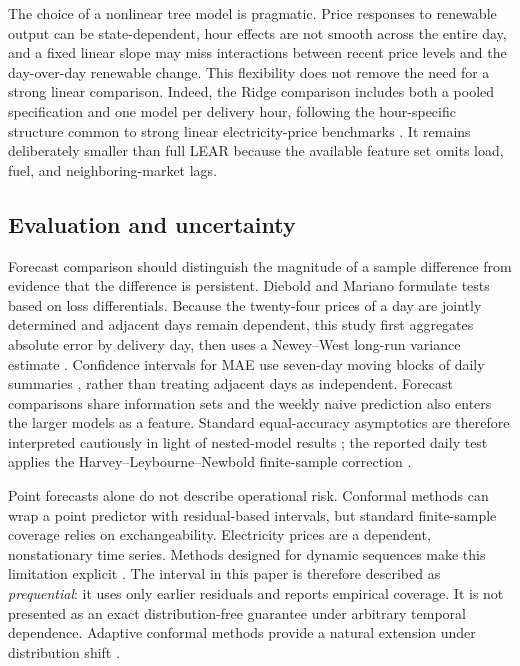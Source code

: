 \documentclass[11pt]{article}
\begin{document}
The choice of a nonlinear tree model is pragmatic.  Price responses to
renewable output can be state-dependent, hour effects are not smooth across
the entire day, and a fixed linear slope may miss interactions between recent
price levels and the day-over-day renewable change.  This flexibility does
not remove the need for a strong linear comparison.  Indeed, the Ridge
comparison includes both a pooled specification and one model per delivery
hour, following the hour-specific structure common to strong linear
electricity-price benchmarks \cite{lago2021}. It remains deliberately smaller
than full LEAR because the available feature set omits load, fuel, and
neighboring-market lags.

\subsection{Evaluation and uncertainty}

Forecast comparison should distinguish the magnitude of a sample difference
from evidence that the difference is persistent.  Diebold and Mariano
\cite{diebold1995} formulate tests based on loss differentials.  Because the
twenty-four prices of a day are jointly determined and adjacent days remain
dependent, this study first aggregates absolute error by delivery day, then
uses a Newey--West long-run variance estimate \cite{newey1987}.  Confidence
intervals for MAE use seven-day moving blocks of daily summaries
\cite{kunsch1989}, rather than treating adjacent days as independent.
Forecast comparisons share information sets and the weekly naive prediction
also enters the larger models as a feature. Standard equal-accuracy
asymptotics are therefore interpreted cautiously in light of nested-model
results \cite{clarkwest2007}; the reported daily test applies the
Harvey--Leybourne--Newbold finite-sample correction \cite{harvey1997}.

Point forecasts alone do not describe operational risk.  Conformal methods
can wrap a point predictor with residual-based intervals, but standard
finite-sample coverage relies on exchangeability.  Electricity prices are a
dependent, nonstationary time series.  Methods designed for dynamic sequences
make this limitation explicit \cite{xu2021}.  The interval in this paper is
therefore described as \emph{prequential}: it uses only earlier residuals and
reports empirical coverage.  It is not presented as an exact distribution-free
guarantee under arbitrary temporal dependence. Adaptive conformal methods
provide a natural extension under distribution shift \cite{gibbs2021}.
\end{document}
